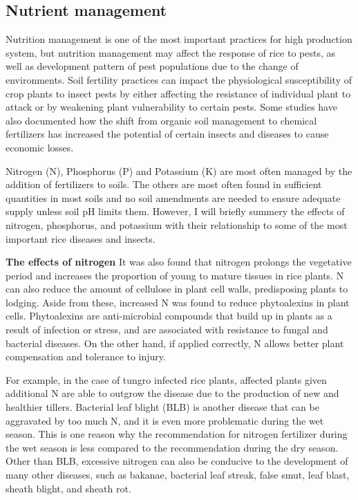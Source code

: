 \subsection*{Nutrient management}
Nutrition management is one of the most important practices for high production system, but nutrition management may affect the response of rice to pests, as well as development pattern of pest populations due to the change of environments. Soil fertility practices can impact the physiological susceptibility of crop plants to insect pests by either affecting the resistance of individual plant to attack or by weakening plant vulnerability to certain pests. Some studies have also documented how the shift from organic soil management to chemical fertilizers has increased the potential of certain insects and diseases to cause economic losses.

Nitrogen (N), Phosphorus (P) and Potassium (K) are most often managed by the addition of fertilizers to soils. The others are most often found in sufficient quantities in most soils and no soil amendments are needed to ensure adequate supply unless soil pH limits them. However, I will briefly summery the effects of nitrogen, phosphorus, and potassium with their relationship to some of the most important rice diseases and insects.

\textbf{The effects of nitrogen}
It was also found that nitrogen prolongs the vegetative period and increases the proportion of young to mature tissues in rice plants. N can also reduce the amount of cellulose in plant cell walls, predisposing plants to lodging. Aside from these, increased N was found to reduce phytoalexins in plant cells. Phytoalexins are anti-microbial compounds that build up in plants as a result of infection or stress, and are associated with resistance to fungal and bacterial diseases. On the other hand, if applied correctly, N allows better plant compensation and tolerance to injury. 

For example, in the case of tungro infected rice plants, affected plants given additional N are able to outgrow the disease due to the production of new and healthier tillers. Bacterial leaf blight (BLB) is another disease that can be aggravated by too much N, and it is even more problematic during the wet season. This is one reason why the recommendation for nitrogen fertilizer during the wet season is less compared to the recommendation during the dry season. Other than BLB, excessive nitrogen can also be conducive to the development of many other diseases, such as bakanae, bacterial leaf streak, false smut, leaf blast, sheath blight, and sheath rot.

